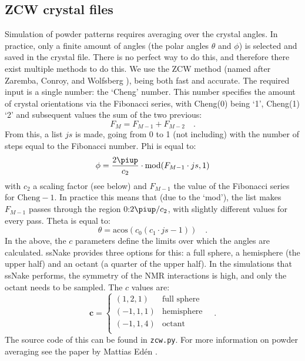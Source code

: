 \documentclass[11pt,a4paper]{article}
\begin{document}
\subsection*{ZCW crystal files}
Simulation of powder patterns requires averaging over the crystal angles.
In practice, only a finite amount of angles (the polar angles $\theta$ and $\phi$) is
selected and saved in the crystal file. There is no perfect way to do this, and therefore there
exist multiple methods to do this. We use the ZCW method (named after Zaremba, Conroy, and Wolfsberg
\cite{zaremba1966good,conroy1967molecular,cheng1973investigations}), being both fast and accurate.
The required input is a single number: the `Cheng' number. This number specifies the amount of
crystal orientations via the Fibonacci series, with Cheng(0) being `1', Cheng(1) `2' and subsequent
values the sum of the two previous: \begin{equation} F_M = F_{M-1} + F_{M-2}	\quad .
\end{equation}
From this, a list $js$ is made, going from 0 to 1 (not including) with the number of steps equal to
the Fibonacci number. Phi is equal to: \begin{equation} \phi = \dfrac{2  \piup}{c_2} \cdot
  \text{mod}(F_{M-1} \cdot js, 1) \end{equation}
with $c_2$ a scaling factor (see below) and $F_{M-1}$ the value of the Fibonacci series for
$\text{Cheng} - 1$. In practice this means that (due to the `mod'), the list makes $F_{M-1}$ passes
through the region 0:$2  \piup/c_2$, with slightly different values for every pass. Theta is equal
to: \begin{equation} \theta = \text{acos}(c_0 (c_1 \cdot js - 1)) \quad .  \end{equation}
In the above, the $c$ parameters define the limits over which the angles are calculated. ssNake
provides three options for this: a full sphere, a hemisphere (the upper half) and an octant (a
quarter of the upper half). In the simulations that ssNake performs, the symmetry of the NMR
interactions is high, and only the octant needs to be sampled. The $c$ values are: \begin{equation}
  \mathbf{c} = \left\{ \begin{array}{ll} (1, 2, 1) & \text{full sphere}\\ (-1, 1, 1)
	 &\text{hemisphere}\\ (-1, 1, 4) &\text{octant}\\ \end{array} \right. \quad .  \end{equation}
The source code of this can be found in \texttt{zcw.py}. For more information on powder averaging
see the paper by Mattias Ed\'{e}n \cite{eden2003computer}.
\end{document}

